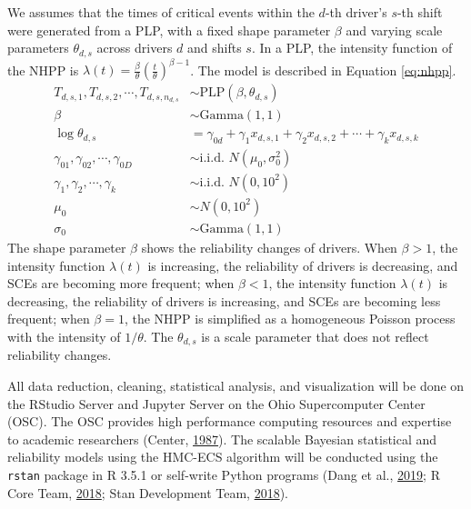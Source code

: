 \documentclass[12pt]{book}
\numberwithin{equation}{chapter}
\begin{document}
We assumes that the times of critical events within the \(d\)-th driver's \(s\)-th shift were generated from a PLP, with a fixed shape parameter \(\beta\) and varying scale parameters \(\theta_{d, s}\) across drivers \(d\) and shifts \(s\). In a PLP, the intensity function of the NHPP is \(\lambda(t) = \frac{\beta}{\theta}(\frac{t}{\theta})^{\beta-1}\). The model is described in Equation \eqref{eq:nhpp}.
\begin{equation}
\begin{aligned}
  T_{d, s, 1}, T_{d, s, 2}, \cdots , T_{d, s, n_{d, s}} & \sim \text{PLP}(\beta, \theta_{d, s})\\
  \beta & \sim \text{Gamma}(1, 1)\\
  \log\theta_{d, s} &= \gamma_{0d} + \gamma_{1}x_{d, s, 1} + \gamma_{2}x_{d, s, 2} + \cdots + \gamma_{k}x_{d, s, k}\\
  \gamma_{01}, \gamma_{02}, \cdots, \gamma_{0D} & \sim \text{i.i.d. }N(\mu_0, \sigma_0^2)\\
  \gamma_1, \gamma_2, \cdots, \gamma_k & \sim \text{i.i.d. }N(0, 10^2)\\
  \mu_0 &\sim N(0, 10^2) \\
  \sigma_0 &\sim \text{Gamma}(1, 1)
\label{eq:nhpp}
\end{aligned}
\end{equation}
The shape parameter \(\beta\) shows the reliability changes of drivers. When \(\beta > 1\), the intensity function \(\lambda(t)\) is increasing, the reliability of drivers is decreasing, and SCEs are becoming more frequent; when \(\beta < 1\), the intensity function \(\lambda(t)\) is decreasing, the reliability of drivers is increasing, and SCEs are becoming less frequent; when \(\beta = 1\), the NHPP is simplified as a homogeneous Poisson process with the intensity of \(1/\theta\). The \(\theta_{d, s}\) is a scale parameter that does not reflect reliability changes.

All data reduction, cleaning, statistical analysis, and visualization will be done on the RStudio Server and Jupyter Server on the Ohio Supercomputer Center (OSC). The OSC provides high performance computing resources and expertise to academic researchers (Center, \protect\hyperlink{ref-OSC1987}{1987}). The scalable Bayesian statistical and reliability models using the HMC-ECS algorithm will be conducted using the \texttt{rstan} package in R 3.5.1 or self-write Python programs (Dang et al., \protect\hyperlink{ref-dang2019hamiltonian}{2019}; R Core Team, \protect\hyperlink{ref-Rcitation}{2018}; Stan Development Team, \protect\hyperlink{ref-rstancitation}{2018}).
\end{document}

